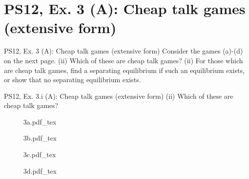 \section{PS12, Ex. 3 (A): Cheap talk games (extensive form)}

\begin{frame}{PS12, Ex. 3 (A): Cheap talk games (extensive form)}
    Consider the games (a)-(d) on the next page. (ii) Which of these are cheap talk games? (ii) For those which are cheap talk games, find a separating equilibrium if such an equilibrium exists, or show that no separating equilibrium exists.
    \vfill\null
\end{frame}

\begin{frame}{PS12, Ex. 3.i (A): Cheap talk games (extensive form)}
    (ii) Which of these are cheap talk games?\vspace{-6pt}
    \begin{multicols}{2}
      \begin{figure}[!h]
        \center{}
        {3a.pdf_tex}
      \end{figure}\vspace{-6pt}
      \begin{figure}[!h]
        \center{}
        {3b.pdf_tex}
      \end{figure}
      \vfill\null\columnbreak
      \begin{figure}[!h]
        \center{}
        {3c.pdf_tex}
      \end{figure}\vspace{-6pt}
      \begin{figure}[!h]
        \center{}
        {3d.pdf_tex}
      \end{figure}
      \vfill\null
    \end{multicols}
\end{frame}

